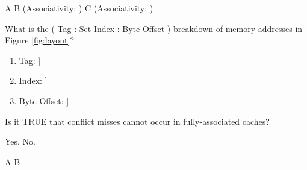 \begin{questions}
{    \begin{solution}
        \begin{checkboxes}
            \choice A
            \CorrectChoice B (Associativity: \fillin[2])
            \choice C (Associativity: \fillin[])
        \end{checkboxes}
    \end{solution}

}

\question[3] What is the ( Tag : Set Index : Byte Offset ) breakdown
of memory addresses in Figure \ref{fig:layout}?
{
    \begin{solution}
        \begin{enumerate}
        \item Tag:         \fillin[6 bits:Address[6:11]]
            \item Index:       \fillin[2 bits:Address[4:5]]
            \item Byte Offset: \fillin[4 bits:Address[0:3]]
        \end{enumerate}
    \end{solution}

}

\question[2] Is it TRUE that conflict misses cannot occur in
fully-associated caches?
{

    \begin{oneparchoices}
        \choice Yes.
        \choice No.
    \end{oneparchoices}
    
    \begin{solution}
        \begin{oneparcheckboxes}
            \CorrectChoice A
            \choice B
        \end{oneparcheckboxes}
    \end{solution}

}
\end{questions}
